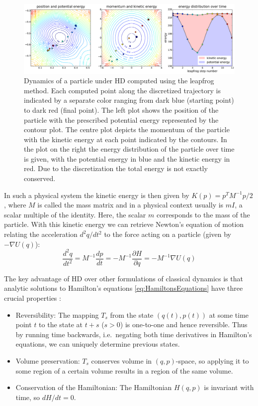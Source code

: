 \begin{figure}
\centering
\includegraphics[width=2.05\columnwidth]{figures/hmc_motion_1hmc_12lf.pdf}
\caption{Dynamics of a particle under HD computed using the leapfrog method. Each computed point along the discretized trajectory is indicated by a separate color ranging from dark blue (starting point) to dark red (final point). The left plot shows the position of the particle with the prescribed potential energy represented by the contour plot. The centre plot depicts the momentum of the particle with the kinetic energy at each point indicated by the contours. In the plot on the right the energy distribution of the particle over time is given, with the potential energy in blue and the kinetic energy in red. Due to the discretization the total energy is not exactly conserved.}
\label{fig:HMC_MOTION_1hmc_12lf}
\end{figure}

In such a physical system the kinetic energy is then given by $K(p) = p^T M^{-1} p /2$, where $M$ is called the mass matrix and in a physical context usually is $m I$, a scalar multiple of the identity. Here, the scalar $m$ corresponds to the mass of the particle. With this kinetic energy we can retrieve Newton's equation of motion relating the acceleration $d^2q/dt^2$ to the force acting on a particle (given by $-\nabla U(q)$):
\begin{equation} \label{eq:NewtonsEquation}
\frac{d^2q}{dt^2} = M^{-1} \frac{dp}{dt} = - M^{-1} \frac{\partial H}{\partial q} = - M^{-1} \nabla U(q)
\end{equation}

The key advantage of HD over other formulations of classical dynamics is that analytic solutions to Hamilton's equations \eqref{eq:HamiltonsEquations} have three crucial properties \parencite{Neal2011}:
\begin{itemize}
\item Reversibility: The mapping $T_s$ from the state $(q(t), p(t))$ at some time point $t$ to the state at $t+s$ ($s > 0$) is one-to-one and hence reversible. Thus by running time backwards, i.e.\ negating both time derivatives in Hamilton's equations, we can uniquely determine previous states.
\item Volume preservation: $T_s$ conserves volume in $(q, p)$-space, so applying it to some region of a certain volume results in a region of the same volume.
\item Conservation of the Hamiltonian: The Hamiltonian $H(q, p)$ is invariant with time, so $dH/dt = 0$.
\end{itemize}

